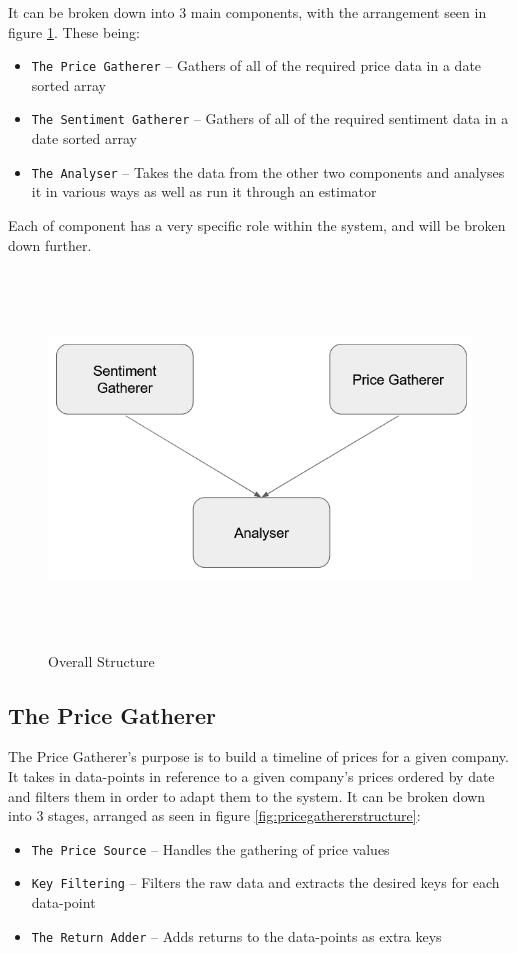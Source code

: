 It can be broken down into 3 main components, with the arrangement seen in figure \ref{fig:overallstructure}. These being:
\begin{itemize}
    \item \texttt{The Price Gatherer} -- Gathers of all of the required price data in a date sorted array
    \item \texttt{The Sentiment Gatherer} -- Gathers of all of the required sentiment data in a date sorted array
    \item \texttt{The Analyser} -- Takes the data from the other two components and analyses it in various ways as well as run it through an estimator
\end{itemize}
Each of component has a very specific role within the system, and will be broken down further.
\begin{figure}[h]
    \centering
    \includegraphics[width=15cm,height=10cm,keepaspectratio]{design/OverallStructure.png}
    \caption{Overall Structure}
    \label{fig:overallstructure}
\end{figure}

\subsection{The Price Gatherer}

The Price Gatherer's purpose is to build a timeline of prices for a given company. It takes in data-points in reference to a given company's prices ordered by date and filters them in order to adapt them to the system. It can be broken down into 3 stages, arranged as seen in figure \ref{fig:pricegathererstructure}:
\begin{itemize}
    \item \texttt{The Price Source} -- Handles the gathering of price values
    \item \texttt{Key Filtering} -- Filters the raw data and extracts the desired keys for each data-point
    \item \texttt{The Return Adder} -- Adds returns to the data-points as extra keys
\end{itemize}

